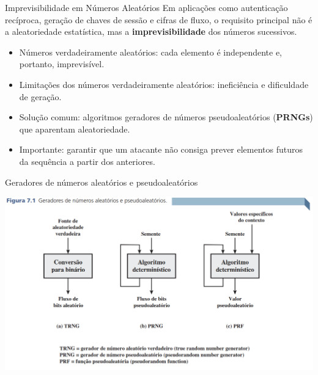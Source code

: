 \begin{frame}{Imprevisibilidade em Números Aleatórios}
    Em aplicações como autenticação recíproca, geração de chaves de sessão e cifras de fluxo, o requisito principal não é a aleatoriedade estatística, mas a \textbf{imprevisibilidade} dos números sucessivos.

    \medskip
    \begin{itemize}
        \item Números verdadeiramente aleatórios: cada elemento é independente e, portanto, imprevisível.
        \item Limitações dos números verdadeiramente aleatórios: ineficiência e dificuldade de geração.
        \item Solução comum: algoritmos geradores de números pseudoaleatórios (\textbf{PRNGs}) que aparentam aleatoriedade.
        \item Importante: garantir que um atacante não consiga prever elementos futuros da sequência a partir dos anteriores.
    \end{itemize}

\end{frame}

\begin{frame}{Geradores de números aleatórios e pseudoaleatórios}

    \centering
    \includegraphics[width=0.9\linewidth]{Figuras/TRNgsPRNGsPRFs.png}


\end{frame}

